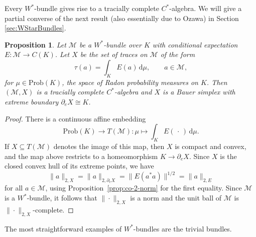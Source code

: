 \documentclass[a4paper,11pt]{amsart}
\newtheorem{proposition}[theorem]{Proposition}
\theoremstyle{definition}
\numberwithin{equation}{section}
\numberwithin{theorem}{section}
\newcommand{\M}{\mathcal{M}}
\begin{document}
Every $W^*$-bundle gives rise to a tracially complete $C^*$-algebra.  We will give a partial converse of the next result (also essentially due to Ozawa) in Section \ref{sec:WStarBundles}.

\begin{proposition}\label{prop:WStarBundleToTC}
	Let $\M$ be a $W^*$-bundle over $K$ with conditional expectation $E\colon \M \rightarrow C(K)$.  Let $X$ be the set of traces on $\M$ of the form
	\begin{equation}\label{eqn:Traces}
		\tau(a) = \int_K E(a) \, \mathrm{d}\mu, \quad \quad a \in \M,
	\end{equation}
	for $\mu \in \mathrm{Prob}(K)$, the space of Radon probability measures on $K$.  Then $(\M, X)$ is a tracially complete $C^*$-algebra and $X$ is a Bauer simplex with extreme boundary $\partial_e X \cong K$.  
\end{proposition}

\begin{proof}
	There is a continuous affine embedding 
	\begin{equation}
		\mathrm{Prob}(K) \longrightarrow T(\mathcal M) \colon \mu \mapsto \int_K E(\,\cdot\,)\,\mathrm{d}\mu.
	\end{equation}
	If $X \subseteq T(\mathcal M)$ denotes the image of this map, then $X$ is compact and convex, and the map above restricts to a homeomorphism $K \rightarrow \partial_e X$.  Since $X$ is the closed convex hull of its extreme points, we have 
	\begin{equation}
		\|a\|_{2,X} = \|a\|_{2,\partial_e X} = \|E(a^*a)\|^{1/2} = \|a\|_{2, E}
	\end{equation} 
	for all $a \in \M$, using Proposition~\ref{prop:co-2-norm} for the first equality.  Since $\M$ is a $W^*$-bundle, it follows that $\|\cdot\|_{2,X}$ is a norm and the unit ball of $\M$ is $\|\cdot\|_{2,X}$-complete. 
\end{proof}

The most straightforward examples of $W^*$-bundles are the trivial bundles.
\end{document}
